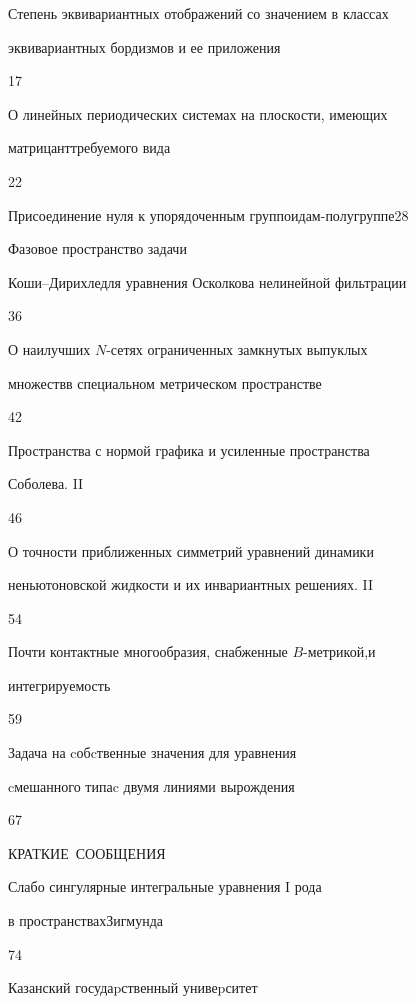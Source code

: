 

{Степень эквивариантных отображений со значением в классах \newline 


эквивариантных бордизмов и ее приложения}{17}




{О линейных периодических системах на плоскости, имеющих  


матрицант\newline требуемого вида}{22}




{Присоединение нуля к упорядоченным группоидам-\newline полугруппе}{28}




{Фазовое пространство задачи


Коши--Дирихле\newline для уравнения Осколкова нелинейной фильтрации}{36}




{О наилучших $N$-сетях ограниченных замкнутых выпуклых 


множеств\newline в специальном метрическом пространстве}{42}




{Пространства с нормой графика и усиленные пространства


Соболева. II}{46}




{О точности приближенных симметрий уравнений динамики \newline


неньютоновской жидкости и их инвариантных решениях. II}{54}




{Почти контактные многообразия, снабженные $B$-метрикой,\newline и 


интегрируемость}{59}




{Задача на cобcтвенные значения для уравнения 


cмешанного типа\newline c двумя линиями вырождения}{67}








\bigskip


\par


\centerline{\Large КРАТКИЕ~СООБЩЕНИЯ}


\bigskip







{Слабо сингулярные интегральные уравнения I рода


в пространствах\newline Зигмунда}{74}








\vfill


\noindent\raisebox{2pt}{\copyright} Казанский госудаpственный унивеpситет





